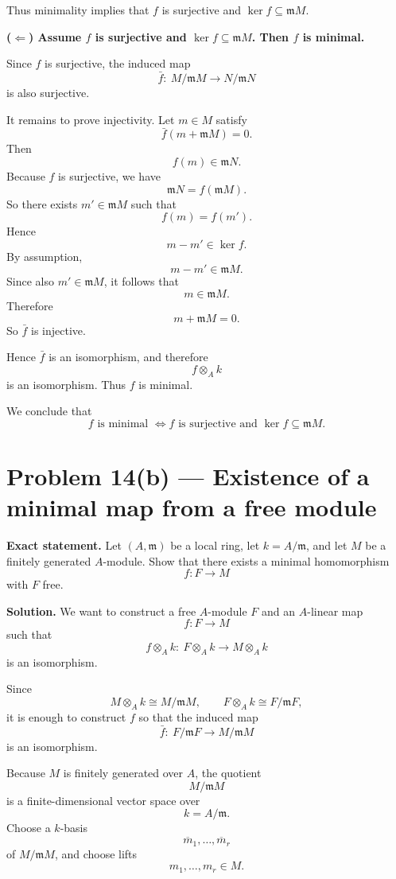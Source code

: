 \documentclass[12pt,a4paper]{article}
\theoremstyle{notespace}
\begin{document}
Thus minimality implies that \(f\) is surjective and \(\ker f\subseteq \mathfrak m M\).

\medskip

\textbf{(\(\Leftarrow\)) Assume \(f\) is surjective and \(\ker f\subseteq \mathfrak m M\). Then \(f\) is minimal.}

Since \(f\) is surjective, the induced map
\[
\bar f:\ M/\mathfrak m M \to N/\mathfrak m N
\]
is also surjective.

It remains to prove injectivity. Let \(m\in M\) satisfy
\[
\bar f(m+\mathfrak m M)=0.
\]
Then
\[
f(m)\in \mathfrak m N.
\]
Because \(f\) is surjective, we have
\[
\mathfrak m N=f(\mathfrak m M).
\]
So there exists \(m'\in \mathfrak m M\) such that
\[
f(m)=f(m').
\]
Hence
\[
m-m'\in \ker f.
\]
By assumption,
\[
m-m'\in \mathfrak m M.
\]
Since also \(m'\in \mathfrak m M\), it follows that
\[
m\in \mathfrak m M.
\]
Therefore
\[
m+\mathfrak m M=0.
\]
So \(\bar f\) is injective.

Hence \(\bar f\) is an isomorphism, and therefore
\[
f\otimes_A k
\]
is an isomorphism. Thus \(f\) is minimal.

\medskip

We conclude that
\[
\boxed{
f \text{ is minimal }
\iff
f \text{ is surjective and } \ker f\subseteq \mathfrak m M.
}
\]

\section{Problem 14(b) --- Existence of a minimal map from a free module}

\textbf{Exact statement.}
Let \((A,\mathfrak m)\) be a local ring, let \(k=A/\mathfrak m\), and let \(M\) be a finitely generated \(A\)-module. Show that there exists a minimal homomorphism
\[
f:F\to M
\]
with \(F\) free.

\textbf{Solution.}
We want to construct a free \(A\)-module \(F\) and an \(A\)-linear map
\[
f:F\to M
\]
such that
\[
f\otimes_A k:\ F\otimes_A k \to M\otimes_A k
\]
is an isomorphism.

Since
\[
M\otimes_A k \cong M/\mathfrak m M,
\qquad
F\otimes_A k \cong F/\mathfrak m F,
\]
it is enough to construct \(f\) so that the induced map
\[
\bar f:\ F/\mathfrak m F \to M/\mathfrak m M
\]
is an isomorphism.

Because \(M\) is finitely generated over \(A\), the quotient
\[
M/\mathfrak m M
\]
is a finite-dimensional vector space over
\[
k=A/\mathfrak m.
\]
Choose a \(k\)-basis
\[
\overline{m}_1,\dots,\overline{m}_r
\]
of \(M/\mathfrak m M\), and choose lifts
\[
m_1,\dots,m_r\in M.
\]
\end{document}
